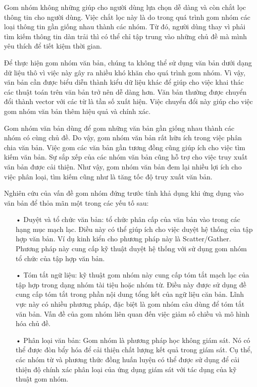 Gom nhóm không những giúp cho người dùng lựa chọn dễ dàng và còn chắt lọc thông tin cho người dùng.
Việc chắt lọc này là do trong quá trình gom nhóm các loại thông tin gần giống nhau thành các nhóm.
Từ đó, người dùng thay vì phải tìm kiếm thông tin dàn trải thì có thể chỉ tập trung vào những chủ đề mà mình yêu thích để tiết kiệm thời gian.

Để thực hiện gom nhóm văn bản, chúng ta không thể sử dụng văn bản dưới dạng dữ liệu thô vì việc này gây ra nhiều khó khăn cho quá trình gom nhóm.
Vì vậy, văn bản cần được biểu diễn thành kiểu dữ liệu khác để giúp cho việc khai thác các thuật toán trên văn bản trở nên dễ dàng hơn.
Văn bản thường được chuyển đổi thành vector với các từ là tần số xuất hiện.
Việc chuyển đổi này giúp cho việc gom nhóm văn bản thêm hiệu quả và chính xác.


Gom nhóm văn bản dùng để gom những văn bản gần giống nhau thành các nhóm có cùng chủ đề. 
Do vậy, gom nhóm văn bản rất hữu ích trong việc phân chia văn bản.
Việc gom các văn bản gần tương đồng cũng giúp ích cho việc tìm kiếm văn bản.
Sự sắp xếp của các nhóm văn bản cũng hỗ trợ cho việc truy xuất văn bản được cải thiện.
Như vậy, gom nhóm văn bản đem lại nhiều lợi ích cho việc phân loại, tìm kiếm cũng như là tăng tốc độ truy xuất văn bản.


Nghiên cứu của vấn đề gom nhóm đứng trước tính khả dụng khi ứng dụng vào văn bản để thỏa mãn một trong các yếu tố sau:
\begin{enumerate}
\item[•]Duyệt và tổ chức văn bản: tổ chức phân cấp của văn bản vào trong các hạng mục mạch lạc.
Điều này có thể giúp ích cho việc duyệt hệ thống của tập hợp văn bản.
Ví dụ kinh kiển cho phương pháp này là Scatter/Gather.
Phương pháp này cung cấp kỹ thuật duyệt hệ thống với sử dụng gom nhóm tổ chức của tập hợp văn bản.
\item[•]Tóm tắt ngữ liệu: kỹ thuật gom nhóm này cung cấp tóm tắt mạch lạc của tập hợp trong dạng nhóm tài tiệu hoặc nhóm từ.
Điều này được sử dụng đề cung cấp tóm tắt trong phần nội dung tổng kết của ngữ liệu căn bản.
Lĩnh vực này có nhiều phương pháp, đặc biệt là gom nhóm câu dùng để tóm tắt văn bản.
Vấn đề của gom nhóm liên quan đến việc giảm số chiều và mô hình hóa chủ đề. 
\item[•]Phân loại văn bản: Gom nhóm là phương pháp học không giám sát.
Nó có thể được đòn bẩy hóa để cải thiện chất lượng kết quả trong giám sát.
Cụ thể, các nhóm từ và phương thức đồng huấn luyện có thể được sử dụng để cải thiện độ chính xác phân loại của ứng dụng giám sát với tác dụng của kỹ thuật gom nhóm.
\end{enumerate}

